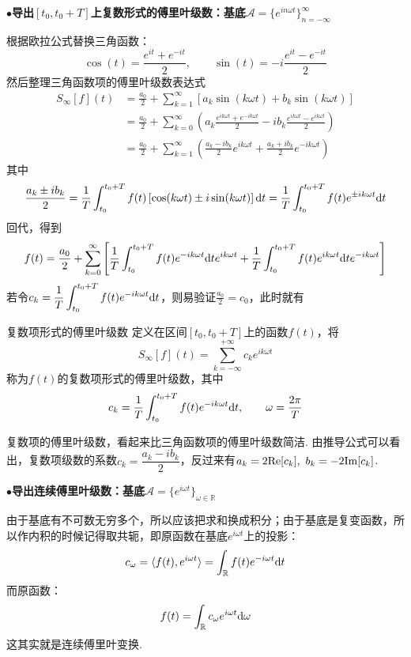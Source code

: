 \vspace{1cm}
\noindent \textbf{
\(\bullet\)导出\([t_0, t_0+T]\)上复数形式的傅里叶级数：基底\(\mathcal{A}=\{e^{in\omega t}\}_{n=-\infty}^{\infty}\)
}

根据欧拉公式替换三角函数：
\[ \cos(t) = \frac{e^{it}+e^{-it}}{2}, \qquad \sin(t) = -i\frac{e^{it}-e^{-it}}{2} \]
然后整理三角函数项的傅里叶级数表达式
\begin{align*}
    S_{\infty}[f](t) &= \frac{a_0}{2}+\sum_{k=1}^{\infty} \left[a_k\sin(k\omega t)+b_k\sin(k\omega t)\right] \\
    &= \frac{a_0}{2} + \sum_{k=0}^{\infty}\left(a_k\frac{e^{ik\omega t}+e^{-ik\omega t}}{2}-ib_k\frac{e^{ik\omega t}-e^{ik\omega t}}{2} \right) \\
    &= \frac{a_0}{2}+\sum_{k=1}^{\infty}\left( \frac{a_k-ib_k}{2}e^{ik\omega t}+\frac{a_k+ib_k}{2}e^{-ik\omega t}\right)
\end{align*}
其中
\[\frac{a_k \pm ib_k}{2} = \frac{1}{T}\int_{t_0}^{t_0+T}f(t)\left[\cos(k\omega t) \pm i\sin(k\omega t) \right] {\rm d}t = \frac{1}{T}\int_{t_0}^{t_0+T}f(t)e^{\pm ik\omega t}{\rm d}t\]
回代，得到
\[f(t) = \frac{a_0}{2} + \sum_{k=0}^{\infty}\left[ \frac{1}{T} \int_{t_0}^{t_0+T}f(t)e^{-ik\omega t}{\rm d}te^{ik\omega t}+ \frac{1}{T}\int_{t_0}^{t_0+T}f(t)e^{ik\omega t}{\rm d}te^{-ik\omega t}\right]\]
若令\(\displaystyle{c_k = \frac{1}{T} \int_{t_0}^{t_0+T}f(t)e^{-ik\omega t}{\rm d}t}\)，则易验证\(\displaystyle{\frac{a_0}{2} = c_0}\)，此时就有
\begin{definition}{复数项形式的傅里叶级数}
    定义在区间\([t_0,t_0+T]\)上的函数\(f(t)\)，将
    \[S_{\infty}[f](t) = \sum_{k=-\infty}^{+\infty}c_ke^{ik\omega t}\]
    称为\(f(t)\)的复数项形式的傅里叶级数，其中
    \[c_k = \frac{1}{T} \int_{t_0}^{t_0+T}f(t)e^{-ik\omega t}{\rm d}t, \qquad \omega=\frac{2\pi}{T}\]
\end{definition}

复数项的傅里叶级数，看起来比三角函数项的傅里叶级数简洁. 由推导公式可以看出，复数项级数的系数\(c_k=\dfrac{a_k-ib_k}{2}\)，反过来有\(a_k=2{\rm Re}[c_k], \,\, b_k=-2{\rm Im}[c_k]\).

\vspace{1cm}
\noindent \textbf{
\(\bullet\)导出连续傅里叶级数：基底\(\mathcal{A}=\{e^{i\omega t}\}_{\omega \in \mathbb{R}}\)
}

由于基底有不可数无穷多个，所以应该把求和换成积分；由于基底是复变函数，所以作内积的时候记得取共轭，即原函数在基底\(e^{i\omega t}\)上的投影：
\[c_\omega = \langle f(t), e^{i\omega t} \rangle = \int_{\mathbb{R}}f(t)e^{-i\omega t}{\rm d}t\]
而原函数：
\[f(t) = \int_{\mathbb{R}}c_\omega e^{i\omega t}{\rm d}\omega\]
这其实就是连续傅里叶变换.

